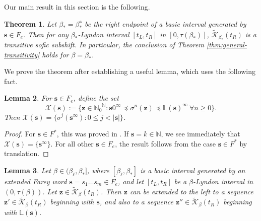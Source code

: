 \documentclass[11pt]{amsart}
\newtheorem{theorem}{Theorem}[section]
\newtheorem{lemma}[theorem]{Lemma}
\theoremstyle{definition}
\theoremstyle{remark}
\numberwithin{equation}{section}
\newcommand{\N}{\ensuremath{\mathbb{N}}}
\renewcommand{\L}{\ensuremath{\mathbb{L}}}
\newcommand{\Kt}{\widetilde{\mathcal{K}}}
\newcommand{\s}{ {\mathbf{s}}}
\newcommand{\z}{\mathbf{z}}
\newcommand{\f}{\infty}
\newcommand{\lle}{\preccurlyeq}
\begin{document}
Our main result in this section is the following.

\begin{theorem} \label{thm:basic-interval-right-endpoint}
Let $\beta_*=\beta_*^\s$ be the right endpoint of a basic interval generated by $\s\in{F_e}$. Then for any $\beta_*$-Lyndon interval $[t_L,t_R]$ in $[0,\tau(\beta_*)]$, $\Kt_{\beta_*}(t_R)$ is a transitive sofic subshift.
In particular, the conclusion of Theorem \ref{thm:general-transitivity} holds for $\beta=\beta_*$.
\end{theorem}

We prove the theorem after establishing a useful lemma, which uses the following fact.

\begin{lemma} \label{lem:Farey-sandwich}
For $\s\in {F_e}$, define the set
\[
\mathcal{X}(\s):=\{\z\in {\N_0}^\N: \s 0^\f\lle \sigma^n(\z)\lle \L(\s)^\f\ \forall n\geq 0\}.
\]
Then $\mathcal{X}(\s)=\{\sigma^j(\s^\f): 0\leq j<|\s|\}$.
\end{lemma}

{
\begin{proof}
For $\s\in F^*$, this was proved in \cite[Proposition 4.4]{Kalle-Kong-Langeveld-Li-18}. If $\s=k\in\N$, we see immediately that $\mathcal{X}(\s)=\{\s^\f\}$. For all other $\s\in F_e$, the result follows from the case $\s\in F^*$ by translation.
\end{proof}
}

\begin{lemma} \label{lem:begin-with-s}
Let $\beta\in(\beta_\ell,\beta_*]$, where $[\beta_\ell,\beta_*]$ is a basic interval generated by { an extended} Farey word $\s=s_1\dots s_m{\in F_e}$, and let $[t_L,t_R]$ be a $\beta$-Lyndon interval in $(0,\tau(\beta))$. Let $\z\in \Kt_{\beta}(t_R)$.
Then $\z$ can be extended to the left to a sequence $\z'\in \Kt_{\beta}(t_R)$ beginning with $\s$, and also to a sequence $\z''\in \Kt_{\beta}(t_R)$ beginning with $\L(\s)$.
\end{lemma}
\end{document}
